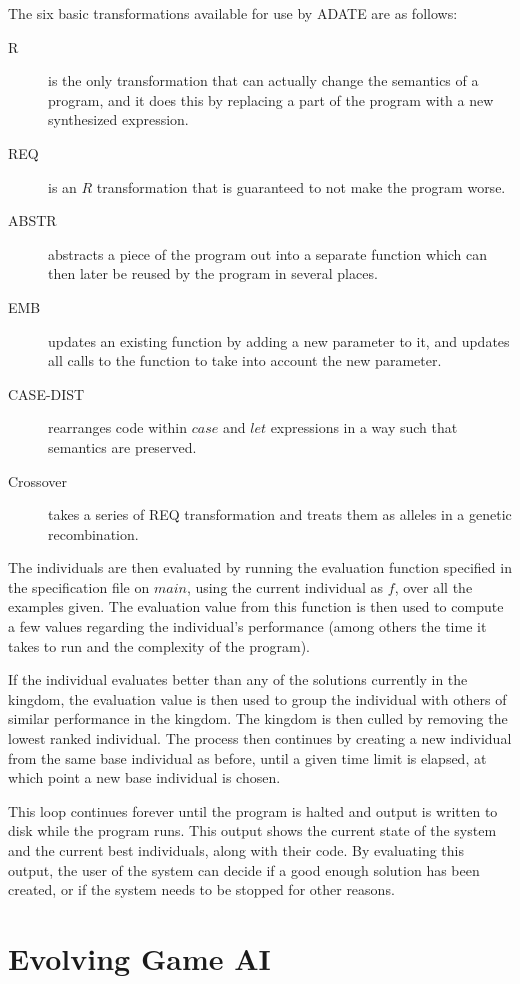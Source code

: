 \documentclass[]{report}
\begin{document}
The six basic transformations available for use by ADATE are as follows:
\begin{description}
\item[R] is the only transformation that can actually change the semantics of a
  program, and it does this by replacing a part of the program with a new
  synthesized expression.
\item[REQ] is an \(R\) transformation that is guaranteed to not make the program
  worse.
\item[ABSTR] abstracts a piece of the program out into a separate function which
  can then later be reused by the program in several places.
\item[EMB] updates an existing function by adding a new parameter to it, and
  updates all calls to the function to take into account the new parameter.
\item[CASE-DIST] rearranges code within \(case\) and \(let\) expressions in a
  way such that semantics are preserved.
\item[Crossover] takes a series of REQ transformation and treats them as alleles
  in a genetic recombination.
\end{description}

The individuals are then evaluated by running the evaluation function specified
in the specification file on \(main\), using the current individual as \(f\),
over all the examples given. The evaluation value from this function is then
used to compute a few values regarding the individual's performance (among others
the time it takes to run and the complexity of the program).

If the individual evaluates better than any of the solutions currently in the
kingdom, the evaluation value is then used to group the individual with others
of similar performance in the kingdom. The kingdom is then culled by removing
the lowest ranked individual. The process then continues by creating a new
individual from the same base individual as before, until a given time limit is
elapsed, at which point a new base individual is chosen.

This loop continues forever until the program is halted and output is written
to disk while the program runs. This output shows the current state of the
system and the current best individuals, along with their code. By evaluating
this output, the user of the system can decide if a good enough solution has
been created, or if the system needs to be stopped for other reasons.

\chapter{Evolving Game AI}
\label{cha:game-ai-via}
\end{document}
